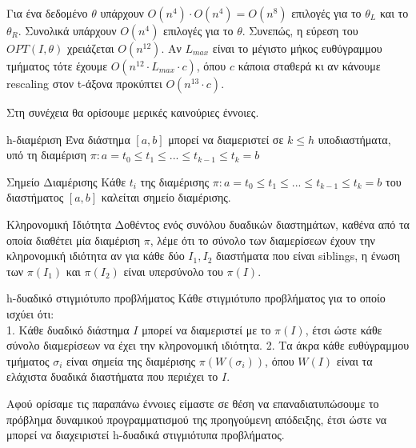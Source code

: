\documentclass[oneside,12pt]{book}
\theoremstyle{definition}
\begin{document}
Για ένα δεδομένο \(θ\) υπάρχουν \(O(n^4) \cdot O(n^4) = O(n^8)\) επιλογές για το \(θ_L\) και το \(θ_R\). Συνολικά υπάρχουν \(O(n^4)\) επιλογές για το \(θ\). Συνεπώς, η εύρεση του \(OPT(I,θ)\) χρειάζεται \(Ο(n^{12})\). Αν \(L_{max}\) είναι το μέγιστο μήκος ευθύγραμμου τμήματος τότε έχουμε \(Ο(n^{12} \cdot L_{max} \cdot c)\), όπου \(c\) κάποια σταθερά κι αν κάνουμε rescaling στον t-άξονα προκύπτει \(Ο(n^{13} \cdot c)\).

Στη συνέχεια θα ορίσουμε μερικές καινούριες έννοιες. \\

\begin{mydefinition}{h-διαμέριση}{}
	Ένα διάστημα \([a,b]\) μπορεί να διαμεριστεί σε \(k \leq h\) υποδιαστήματα, υπό τη διαμέριση \(π: a = t_0 \leq t_1 \leq ... \leq t_{k-1} \leq t_k = b\)
\end{mydefinition}

\begin{mydefinition}{Σημείο Διαμέρισης}{}
	Κάθε \(t_i\) της διαμέρισης \(π: a = t_0 \leq t_1 \leq ... \leq t_{k-1} \leq t_k = b\) του διαστήματος \([a,b]\) καλείται σημείο διαμέρισης.
\end{mydefinition}

\begin{mydefinition}{Κληρονομική Ιδιότητα}{}
	Δοθέντος ενός συνόλου δυαδικών διαστημάτων, καθένα από τα οποία διαθέτει μία διαμέριση \(π\), λέμε ότι το σύνολο των διαμερίσεων έχουν την κληρονομική ιδιότητα αν για κάθε δύο \(I_1, I_2\) διαστήματα που είναι siblings, η ένωση των \(π(I_1)\) και \(π(I_2)\) είναι υπερσύνολο του \(π(Ι)\). 
\end{mydefinition}

\begin{mydefinition}{h-δυαδικό στιγμιότυπο προβλήματος}{}
	Κάθε στιγμιότυπο προβλήματος για το οποίο ισχύει ότι: \\
	1. Κάθε δυαδικό διάστημα \(I\) μπορεί να διαμεριστεί με το \(π(Ι)\), έτσι ώστε κάθε σύνολο διαμερίσεων να έχει την κληρονομική ιδιότητα.
	2. Τα άκρα κάθε ευθύγραμμου τμήματος \(σ_i\) είναι σημεία της διαμέρισης \(π(W(σ_i))\), όπου \(W(I)\) είναι τα ελάχιστα δυαδικά διαστήματα που περιέχει το \(I\). 
\end{mydefinition}

Αφού ορίσαμε τις παραπάνω έννοιες είμαστε σε θέση να επαναδιατυπώσουμε το πρόβλημα δυναμικού προγραμματισμού της προηγούμενη απόδειξης, έτσι ώστε να μπορεί να διαχειριστεί h-δυαδικά στιγμιότυπα προβλήματος. \\
\end{document}

